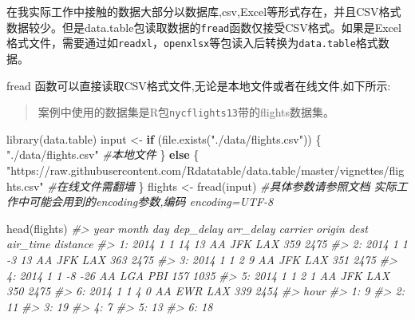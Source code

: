 \documentclass[
]{book}
\newenvironment{Shaded}{\begin{snugshade}}{\end{snugshade}}
\newcommand{\CommentTok}[1]{\textcolor[rgb]{0.56,0.35,0.01}{\textit{#1}}}
\newcommand{\ControlFlowTok}[1]{\textcolor[rgb]{0.13,0.29,0.53}{\textbf{#1}}}
\newcommand{\FunctionTok}[1]{\textcolor[rgb]{0.00,0.00,0.00}{#1}}
\newcommand{\NormalTok}[1]{#1}
\newcommand{\OtherTok}[1]{\textcolor[rgb]{0.56,0.35,0.01}{#1}}
\newcommand{\StringTok}[1]{\textcolor[rgb]{0.31,0.60,0.02}{#1}}
\begin{document}
在我实际工作中接触的数据大部分以数据库,csv,Excel等形式存在，并且CSV格式数据较少。但是data.table包读取数据的\texttt{fread}函数仅接受CSV格式。如果是Excel格式文件，需要通过如\texttt{readxl}，\texttt{openxlsx}等包读入后转换为\texttt{data.table}格式数据。

fread 函数可以直接读取CSV格式文件,无论是本地文件或者在线文件,如下所示:

\begin{quote}
案例中使用的数据集是R包\texttt{nycflights13}带的flights数据集。
\end{quote}

\begin{Shaded}
\begin{Highlighting}[]
\FunctionTok{library}\NormalTok{(data.table)}
\NormalTok{input }\OtherTok{\textless{}{-}} \ControlFlowTok{if}\NormalTok{ (}\FunctionTok{file.exists}\NormalTok{(}\StringTok{"./data/flights.csv"}\NormalTok{)) \{}
   \StringTok{"./data/flights.csv"} \CommentTok{\#本地文件}
\NormalTok{\} }\ControlFlowTok{else}\NormalTok{ \{}
  \StringTok{"https://raw.githubusercontent.com/Rdatatable/data.table/master/vignettes/flights.csv"} \CommentTok{\#在线文件需翻墙}
\NormalTok{\}}
\NormalTok{flights }\OtherTok{\textless{}{-}} \FunctionTok{fread}\NormalTok{(input) }\CommentTok{\#具体参数请参照文档  实际工作中可能会用到的encoding参数,编码 encoding=\textquotesingle{}UTF{-}8\textquotesingle{}}

\FunctionTok{head}\NormalTok{(flights)}
\CommentTok{\#\textgreater{}    year month day dep\_delay arr\_delay carrier origin dest air\_time distance}
\CommentTok{\#\textgreater{} 1: 2014     1   1        14        13      AA    JFK  LAX      359     2475}
\CommentTok{\#\textgreater{} 2: 2014     1   1        {-}3        13      AA    JFK  LAX      363     2475}
\CommentTok{\#\textgreater{} 3: 2014     1   1         2         9      AA    JFK  LAX      351     2475}
\CommentTok{\#\textgreater{} 4: 2014     1   1        {-}8       {-}26      AA    LGA  PBI      157     1035}
\CommentTok{\#\textgreater{} 5: 2014     1   1         2         1      AA    JFK  LAX      350     2475}
\CommentTok{\#\textgreater{} 6: 2014     1   1         4         0      AA    EWR  LAX      339     2454}
\CommentTok{\#\textgreater{}    hour}
\CommentTok{\#\textgreater{} 1:    9}
\CommentTok{\#\textgreater{} 2:   11}
\CommentTok{\#\textgreater{} 3:   19}
\CommentTok{\#\textgreater{} 4:    7}
\CommentTok{\#\textgreater{} 5:   13}
\CommentTok{\#\textgreater{} 6:   18}
\end{Highlighting}
\end{Shaded}
\end{document}
